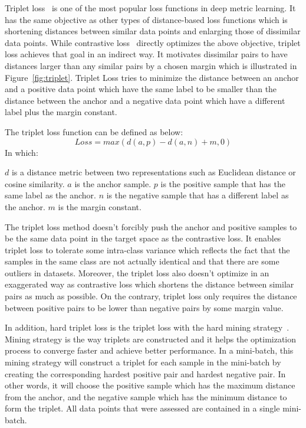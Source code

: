 \documentclass[../main.tex]{subfiles}
\begin{document}
Triplet loss~\cite{schroff2015facenet} is one of the most popular loss functions in deep metric learning. It has the same objective as other types of distance-based loss functions which is shortening distances between similar data points and enlarging those of dissimilar data points. While contrastive loss~\cite{hadsell2006dimensionality} directly optimizes the above objective, triplet loss achieves that goal in an indirect way. It motivates dissimilar pairs to have distances larger than any similar pairs by a chosen margin which is illustrated in Figure~\ref{fig:triplet}. Triplet Loss tries to minimize the distance between an anchor and a positive data point which have the same label to be smaller than the distance between the anchor and a negative data point which have a different label plus the margin constant.

The triplet loss function can be defined as below:
\begin{equation}\label{eq:triplet}
    Loss = max(d(a, p) - d(a, n) + m, 0)
\end{equation}
In which:
\begin{outline}
 \1 $d$ is a distance metric between two representations such as Euclidean distance or cosine similarity.
 \1 $a$ is the anchor sample.
 \1 $p$ is the positive sample that has the same label as the anchor.
 \1 $n$ is the negative sample that has a different label as the anchor.
 \1 $m$ is the margin constant.
\end{outline}

The triplet loss method doesn't forcibly push the anchor and positive samples to be the same data point in the target space as the contrastive loss. It enables triplet loss to tolerate some intra-class variance which reflects the fact that the samples in the same class are not actually identical and that there are some outliers in datasets. Moreover, the triplet loss also doesn't optimize in an exaggerated way as contrastive loss which shortens the distance between similar pairs as much as possible. On the contrary, triplet loss only requires the distance between positive pairs to be lower than negative pairs by some margin value.

In addition, hard triplet loss is the triplet loss with the hard mining strategy~\cite{hermans2017defense}. Mining strategy is the way triplets are constructed and it helps the optimization process to converge faster and achieve better performance. In a mini-batch, this mining strategy will construct a triplet for each sample in the mini-batch by creating the corresponding hardest positive pair and hardest negative pair. In other words, it will choose the positive sample which has the maximum distance from the anchor, and the negative sample which has the minimum distance to form the triplet. All data points that were assessed are contained in a single mini-batch.
\end{document}
